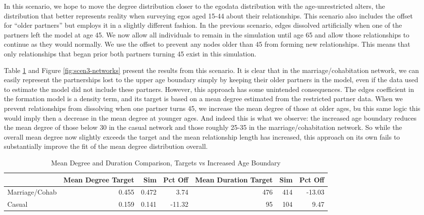 \documentclass [11pt, proquest] {uwthesis}[2015/03/03]
\begin{document}
In this scenario, we hope to move the degree distribution closer to the egodata distribution with the age-unrestricted alters, the distribution that better represents reality when surveying egos aged 15-44 about their relationships. This scenario also includes the offset for ``older partners'' but employs it in a slightly different fashion. In the previous scenario, edges dissolved artificially when one of the partners left the model at age 45. We now allow all individuals to remain in the simulation until age 65 and allow those relationships to continue as they would normally. We use the offset to prevent any nodes older than 45 from forming new relationships. This means that only relationships that began prior both partners turning 45 exist in this simulation.

Table \ref{tab:scen3-networks} and Figure \ref{fig:scen3-networks} present the results from this scenario. It is clear that in the marriage/cohabitation network, we can easily represent the partnerships lost to the upper age boundary simply by keeping their older partners in the model, even if the data used to estimate the model did not include these partners. However, this approach has some unintended consequences. The edges coefficient in the formation model is a density term, and its target is based on a mean degree estimated from the restricted partner data. When we prevent relationships from dissolving when one partner turns 45, we increase the mean degree of those at older ages, bu this same logic this would imply then a decrease in the mean degree at younger ages. And indeed this is what we observe: the increased age boundary reduces the mean degree of those below 30 in the casual network and those roughly 25-35 in the marriage/cohabitation network. So while the overall mean degree now slightly exceeds the target and the mean relationship length has increased, this approach on its own fails to substantially improve the fit of the mean degree distribution overall.
\begin{table}

\caption{\label{tab:scen3-networks}Mean Degree and Duration Comparison, Targets vs Increased Age Boundary}
\centering
\begin{tabular}[t]{lrrrrrr}
\toprule
  & Mean Degree Target & Sim & Pct Off & Mean Duration Target & Sim & Pct Off\\
\midrule
Marriage/Cohab & 0.455 & 0.472 & 3.74 & 476 & 414 & -13.03\\
Casual & 0.159 & 0.141 & -11.32 & 95 & 104 & 9.47\\
\bottomrule
\end{tabular}
\end{table}
\end{document}
